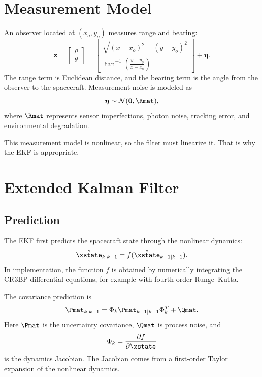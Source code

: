 \documentclass[11pt]{article}
\begin{document}
\section{Measurement Model}

An observer located at $(x_o,y_o)$ measures range and bearing:
\begin{equation}
  \bm{z}
  =
  \begin{bmatrix}
    \rho\\
    \theta
  \end{bmatrix}
  =
  \begin{bmatrix}
    \sqrt{(x-x_o)^2+(y-y_o)^2}\\
    \tan^{-1}\!\left(\frac{y-y_o}{x-x_o}\right)
  \end{bmatrix}
  + \bm{\eta}.
\end{equation}
The range term is Euclidean distance, and the bearing term is the angle from
the observer to the spacecraft. Measurement noise is modeled as
\begin{equation}
  \bm{\eta} \sim \mathcal{N}(\bm{0},\Rmat),
\end{equation}
where $\Rmat$ represents sensor imperfections, photon noise, tracking error,
and environmental degradation.

This measurement model is nonlinear, so the filter must linearize it. That is
why the EKF is appropriate.

\section{Extended Kalman Filter}

\subsection{Prediction}

The EKF first predicts the spacecraft state through the nonlinear dynamics:
\begin{equation}
  \hat{\xstate}_{k|k-1}
  =
  f(\hat{\xstate}_{k-1|k-1}).
\end{equation}
In implementation, the function $f$ is obtained by numerically integrating the
CR3BP differential equations, for example with fourth-order Runge--Kutta.

The covariance prediction is
\begin{equation}
  \Pmat_{k|k-1}
  =
  \Phi_k \Pmat_{k-1|k-1}\Phi_k^{T}
  + \Qmat.
\end{equation}
Here $\Pmat$ is the uncertainty covariance, $\Qmat$ is process noise, and
\begin{equation}
  \Phi_k = \frac{\partial f}{\partial \xstate}
\end{equation}
is the dynamics Jacobian. The Jacobian comes from a first-order Taylor
expansion of the nonlinear dynamics.
\end{document}
